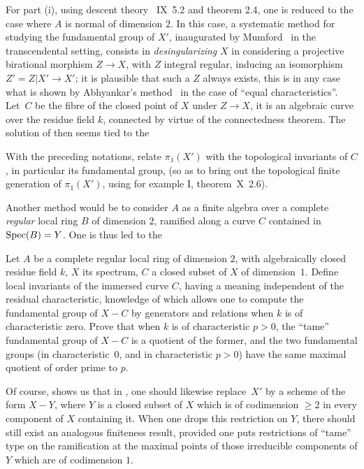 For part (i), using descent theory ~IX~5.2 and theorem 2.4, one is reduced to the case where $A$ is normal of dimension $2$. In this case, a systematic method for studying the fundamental group of $X'$, inaugurated by Mumford~\cite{XIII.5} in the transcendental setting, consists in \emph{desingularizing} $X$ \ie in considering a projective birational morphism $Z\to X$, with $Z$ integral regular, inducing an isomorphism $Z'=Z|X'\to X'$; it is plausible that such a $Z$ always exists, this is in any case what is shown by Abhyankar's method~\cite{XIII.1} in the case of ``equal characteristics''. Let~$C$ be the fibre of the closed point of $X$ under $Z\to X$, it is an algebraic curve over the residue field $k$, connected by virtue of the connectedness theorem. The solution of  then seems tied to the

\begin{problem} \label{XIII.3.2}
With the preceding notations, relate $\pi_1(X')$ with the topological invariants of $C$, in particular its fundamental group, (so as to bring out the topological finite generation of $\pi_1(X')$, using for example \SGA \textup{I}, theorem~\textup{X~2.6}).
\end{problem}

Another method would be to consider $A$ as a finite algebra over a complete \emph{regular} local ring $B$ of dimension $2$, ramified along a curve $C$ contained in $\operatorname{Spec}(B)=Y$. One is thus led to the

\begin{problem} \label{XIII.3.3}
Let $A$ be a complete regular local ring of dimension $2$, with algebraically closed residue field $k$, $X$ its spectrum, $C$ a closed subset of $X$ of dimension~$1$. Define local invariants of the immersed curve $C$, having a meaning independent of the residual characteristic, knowledge of which allows one to compute the fundamental group of $X-C$ by generators and relations when $k$ is of characteristic zero. Prove that when $k$ is of characteristic $p> 0$, the ``tame'' fundamental group of $X-C$ is a quotient of the former, and the two fundamental groups (in characteristic~$0$, and in characteristic $p> 0$) have the same maximal quotient of order prime to $p$.
\end{problem}

Of course,  shows us that in , one should likewise replace~$X'$ by a scheme of the form $X-Y$, where $Y$ is a closed subset of $X$ which is of codimension $\ge 2$ in every component of $X$ containing it. When one drops this restriction on $Y$, there should still exist an analogous finiteness result, provided one puts restrictions of ``tame'' type on the ramification at the maximal points of those irreducible components of $Y$ which are of codimension $1$.

